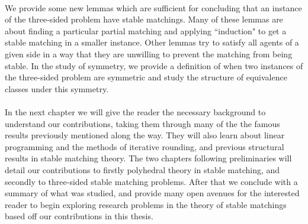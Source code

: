 \paragraph{}
We provide some new lemmas which are sufficient for concluding that an instance of the three-sided problem have stable matchings. Many of these lemmas are about finding a particular partial matching and applying ``induction" to get a stable matching in a smaller instance. Other lemmas try to satisfy all agents of a given side in a way that they are unwilling to prevent the matching from being stable. In the study of symmetry, we provide a definition of when two instances of the three-sided problem are symmetric and study the structure of equivalence classes under this symmetry.
\paragraph{}
In the next chapter we will give the reader the necessary background to understand our contributions, taking them through many of the the famous results previously mentioned along the way. They will also learn about linear programming and the methods of iterative rounding, and previous structural results in stable matching theory. The two chapters following preliminaries will detail our contributions to firstly polyhedral theory in stable matching, and secondly to three-sided stable matching problems. After that we conclude with a summary of what was studied, and provide many open avenues for the interested reader to begin exploring research problems in the theory of stable matchings based off our contributions in this thesis.
